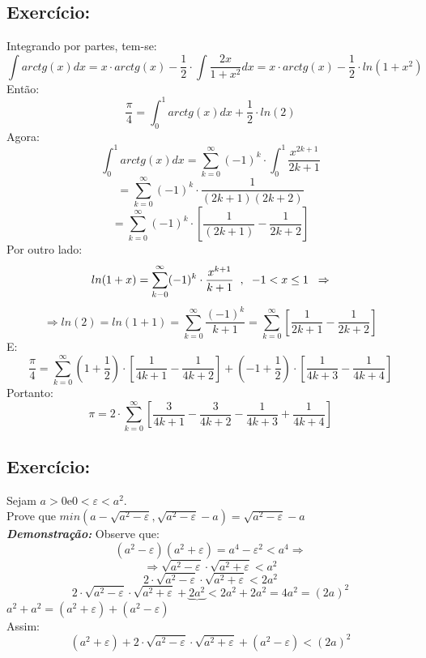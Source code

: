 \documentclass[12pt]{article}
\begin{document}
\subsection{Exercício:}
Integrando por partes, tem-se:
\[\int arctg(x)dx=x\cdot arctg(x)-\frac{1}{2}\cdot\int\frac{2x}{1+x^2}dx=x\cdot arctg(x)-\frac{1}{2}\cdot ln(1+x^2)\]
Então:
\[\frac{\pi}{4}=\int_{0}^{1}arctg(x)dx+\frac{1}{2}\cdot ln(2)\]
Agora:
\[\int_{0}^{1}arctg(x)dx=\sum_{k=0}^{\infty}(-1)^k\cdot\int_{0}^{1}\frac{x^{2k+1}}{2k+1}\]
\[=\sum_{k=0}^{\infty}(-1)^k\cdot\frac{1}{(2k+1)(2k+2)}\]
\[=\sum_{k=0}^{\infty}(-1)^k\cdot\left[\frac{1}{(2k+1)}-\frac{1}{2k+2}\right]\]
Por outro lado:
\[ln(1+x)=\sum_{k-0}^{\infty}(-1)^k\cdot\frac{x^{k+1}}{k+1}\hspace{0.2cm},\hspace{0.2cm}-1<x\leq 1\hspace{0.2cm}\Rightarrow \]
\[\Rightarrow ln(2)=ln(1+1)=\sum_{k=0}^{\infty}\frac{(-1)^k}{k+1}=\sum_{k=0}^{\infty}\left[\frac{1}{2k+1}-\frac{1}{2k+2}\right]\]
E:
\[\frac{\pi}{4}=\sum_{k=0}^{\infty}(1+\frac{1}{2})\cdot\left[\frac{1}{4k+1}-\frac{1}{4k+2}\right]+(-1+\frac{1}{2})\cdot\left[\frac{1}{4k+3}-\frac{1}{4k+4}\right]\]
Portanto:
\[\pi=2\cdot\sum_{k=0}^{\infty}\left[\frac{3}{4k+1}-\frac{3}{4k+2}-\frac{1}{4k+3}+\frac{1}{4k+4}\right]\]
\subsection{Exercício:}
Sejam \(a>0\)\hspace{0.2cm}e\hspace{0.2cm}\(0<\varepsilon<a^2\).\\
Prove que \(min(a-\sqrt{a^2-\varepsilon}, \sqrt{a^2-\varepsilon}-a) = \sqrt{a^2-\varepsilon}-a\)\\
\textbf{\textit{Demonstração:}}
Observe que:
\[(a^2-\varepsilon)(a^2+\varepsilon)=a^4-\varepsilon^2<a^4\Rightarrow \]
\[\Rightarrow\sqrt{a^2-\varepsilon}\cdot\sqrt{a^2+\varepsilon}<a^2\]
\[ 2\cdot\sqrt{a^2-\varepsilon}\cdot\sqrt{a^2+\varepsilon}<2a^2\]
\[ 2\cdot\sqrt{a^2-\varepsilon}\cdot\sqrt{a^2+\varepsilon}+\underbrace{2a^2}<2a^2+2a^2=4a^2=(2a)^2\]
\hspace{5.9cm}\(a^2+a^2=(a^2+\varepsilon)+(a^2-\varepsilon)\)\\
Assim:
\[(a^2+\varepsilon)+2\cdot\sqrt{a^2-\varepsilon}\cdot\sqrt{a^2+\varepsilon}+(a^2-\varepsilon)<(2a)^2\]
\end{document}
